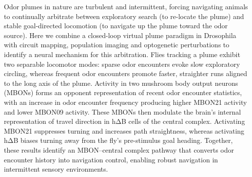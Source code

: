 \begin{sloppypar}
Odor plumes in nature are turbulent and intermittent, forcing navigating animals to continually arbitrate between exploratory search (to re-locate the plume) and stable goal-directed locomotion (to navigate up the plume toward the odor source). Here we combine a closed-loop virtual plume paradigm in Drosophila with circuit mapping, population imaging and optogenetic perturbations to identify a neural mechanism for this arbitration. Flies tracking a plume exhibit two separable locomotor modes: sparse odor encounters evoke slow exploratory circling, whereas frequent odor encounters promote faster, straighter runs aligned to the long axis of the plume. Activity in two mushroom body output neurons (MBONs) forms an opponent representation of recent odor encounter statistics, with an increase in odor encounter frequency producing higher MBON21 activity and lower MBON09 activity. These MBONs then modulate the brain’s internal representation of travel direction in hΔB cells of the central complex. Activating MBON21 suppresses turning and increases path straightness, whereas activating hΔB biases turning away from the fly’s pre-stimulus goal heading. Together, these results identify an MBON--central complex pathway that converts odor encounter history into navigation control, enabling robust navigation in intermittent sensory environments.
\end{sloppypar}
